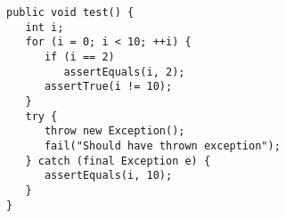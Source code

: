 \begin{lstlisting}
public void test() {
   int i;
   for (i = 0; i < 10; ++i) {
      if (i == 2)
         assertEquals(i, 2);
      assertTrue(i != 10);
   }
   try {
      throw new Exception();
      fail("Should have thrown exception");
   } catch (final Exception e) {
      assertEquals(i, 10);
   }
}
\end{lstlisting}
